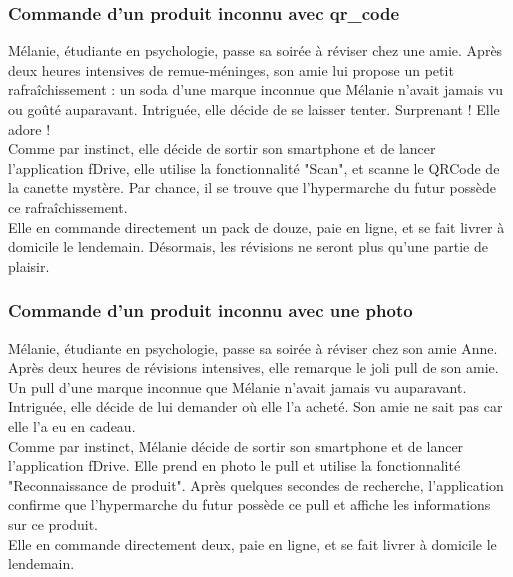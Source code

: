 				\subsubsection{Commande d'un produit inconnu avec \gls{qr_code}}
					Mélanie, étudiante en psychologie, passe sa soirée à réviser chez une amie. Après deux heures intensives de remue-méninges, son amie lui propose un petit rafraîchissement : un soda d'une marque inconnue que Mélanie n'avait jamais vu ou goûté auparavant. Intriguée, elle décide de se laisser tenter. Surprenant ! Elle adore !\\
					Comme par instinct, elle décide de sortir son \gls{smartphone} et de lancer l'application fDrive, elle utilise la fonctionnalité "Scan", et scanne le QRCode de la canette mystère. Par chance, il se trouve que l'\gls{hypermarche} du futur possède ce rafraîchissement.\\
					Elle en commande directement un pack de douze, paie en ligne, et se fait livrer à domicile le lendemain. Désormais, les révisions ne seront plus qu'une partie de plaisir.
				\subsubsection{Commande d'un produit inconnu avec une photo}
					Mélanie, étudiante en psychologie, passe sa soirée à réviser chez son amie Anne. Après deux heures de révisions intensives, elle remarque le joli pull de son amie. Un pull d'une marque inconnue que Mélanie n'avait jamais vu auparavant. Intriguée, elle décide de lui demander où elle l'a acheté. Son amie ne sait pas car elle l'a eu en cadeau.\\
					Comme par instinct, Mélanie décide de sortir son \gls{smartphone} et de lancer l'application fDrive. Elle prend en photo le pull et utilise la fonctionnalité "Reconnaissance de produit". Après quelques secondes de recherche,  l'application confirme que l'\gls{hypermarche} du futur possède ce pull et affiche les informations sur ce produit.\\
					Elle en commande directement deux, paie en ligne, et se fait livrer à domicile le lendemain.
